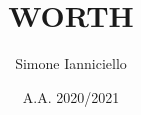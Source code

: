 \documentclass[a4paper, 11pt]{report}
\begin{document}
\title{WORTH}
\author{Simone Ianniciello}
\date{A.A. 2020/2021}
\maketitle


\end{document}
